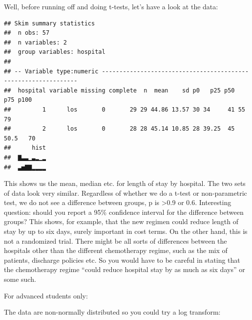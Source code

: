 \documentclass[]{book}
\newenvironment{Shaded}{\begin{snugshade}}{\end{snugshade}}
\newcommand{\DataTypeTok}[1]{\textcolor[rgb]{0.13,0.29,0.53}{#1}}
\newcommand{\KeywordTok}[1]{\textcolor[rgb]{0.13,0.29,0.53}{\textbf{#1}}}
\newcommand{\NormalTok}[1]{#1}
\newcommand{\OperatorTok}[1]{\textcolor[rgb]{0.81,0.36,0.00}{\textbf{#1}}}
\newcommand{\StringTok}[1]{\textcolor[rgb]{0.31,0.60,0.02}{#1}}
\begin{document}
Well, before running off and doing t-tests, let's have a look at the
data:

\begin{Shaded}
\end{Shaded}

\begin{verbatim}
## Skim summary statistics
##  n obs: 57 
##  n variables: 2 
##  group variables: hospital 
## 
## -- Variable type:numeric ---------------------------------------------------------------
##  hospital variable missing complete  n  mean    sd p0   p25 p50  p75 p100
##         1      los       0       29 29 44.86 13.57 30 34     41 55     79
##         2      los       0       28 28 45.14 10.85 28 39.25  45 50.5   70
##      hist
##  ▇▃▃▁▃▂▁▂
##  ▃▅▇▇▂▂▂▂
\end{verbatim}

This shows us the mean, median etc. for length of stay by hospital. The
two sets of data look very similar. Regardless of whether we do a t-test
or non-parametric test, we do not see a difference between groups, p is
\textgreater0.9 or 0.6. Interesting question: should you report a 95\%
confidence interval for the difference between groups? This shows, for
example, that the new regimen could reduce length of stay by up to six
days, surely important in cost terms. On the other hand, this is not a
randomized trial. There might be all sorts of differences between the
hospitals other than the different chemotherapy regime, such as the mix
of patients, discharge policies etc. So you would have to be careful in
stating that the chemotherapy regime ``could reduce hospital stay by as
much as six days'' or some such.

For advanced students only:

The data are non-normally distributed so you could try a log transform:

\begin{Shaded}
\end{Shaded}
\end{document}
